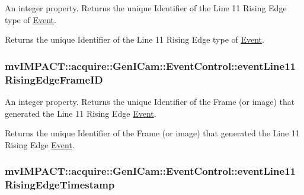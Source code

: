 An integer property. Returns the unique Identifier of the Line 11 Rising Edge type of \hyperlink{classmv_i_m_p_a_c_t_1_1acquire_1_1_event}{Event}. 

Returns the unique Identifier of the Line 11 Rising Edge type of \hyperlink{classmv_i_m_p_a_c_t_1_1acquire_1_1_event}{Event}. \hypertarget{classmv_i_m_p_a_c_t_1_1acquire_1_1_gen_i_cam_1_1_event_control_abf298f356a34ef56bad568ef0eaf8790}{
\subsubsection[{event\+Line11\+Rising\+Edge\+Frame\+I\+D}]{ mv\+I\+M\+P\+A\+C\+T\+::acquire\+::\+Gen\+I\+Cam\+::\+Event\+Control\+::event\+Line11\+Rising\+Edge\+Frame\+I\+D}}\label{classmv_i_m_p_a_c_t_1_1acquire_1_1_gen_i_cam_1_1_event_control_abf298f356a34ef56bad568ef0eaf8790}


An integer property. Returns the unique Identifier of the Frame (or image) that generated the Line 11 Rising Edge \hyperlink{classmv_i_m_p_a_c_t_1_1acquire_1_1_event}{Event}. 

Returns the unique Identifier of the Frame (or image) that generated the Line 11 Rising Edge \hyperlink{classmv_i_m_p_a_c_t_1_1acquire_1_1_event}{Event}. \hypertarget{classmv_i_m_p_a_c_t_1_1acquire_1_1_gen_i_cam_1_1_event_control_aefbc4547988bc8a20c71eee0ca026364}{
\subsubsection[{event\+Line11\+Rising\+Edge\+Timestamp}]{ mv\+I\+M\+P\+A\+C\+T\+::acquire\+::\+Gen\+I\+Cam\+::\+Event\+Control\+::event\+Line11\+Rising\+Edge\+Timestamp}}\label{classmv_i_m_p_a_c_t_1_1acquire_1_1_gen_i_cam_1_1_event_control_aefbc4547988bc8a20c71eee0ca026364}


